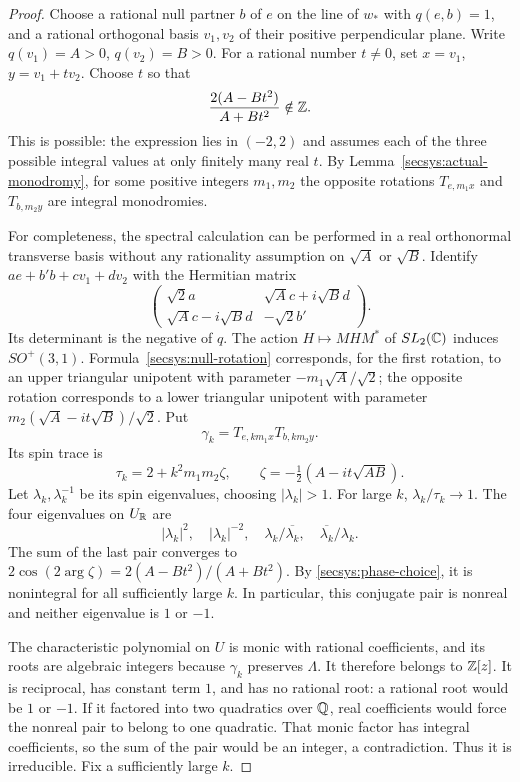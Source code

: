 \begin{proof}
Choose a rational null partner $b$ of $e$ on the line of $w_*$ with
$q(e,b)=1$, and a rational orthogonal basis $v_1,v_2$ of their positive
perpendicular plane.  Write $q(v_1)=A>0$, $q(v_2)=B>0$.
For a rational number $t\ne0$, set $x=v_1$, $y=v_1+t v_2$.
Choose $t$ so that
\begin{equation}\label{secsys:phase-choice}
                  \frac{2(A-Bt^2)}{A+Bt^2}\notin\mathbb Z.
\end{equation}
This is possible: the expression lies in $(-2,2)$ and assumes each
of the three possible integral values at only finitely many real $t$.
By Lemma~\ref{secsys:actual-monodromy}, for some positive integers
$m_1,m_2$ the opposite rotations $T_{e,m_1x}$ and $T_{b,m_2y}$ are
integral monodromies.

For completeness, the spectral calculation can be performed in a real
orthonormal transverse basis without any rationality assumption on
$\sqrt A$ or $\sqrt B$.  Identify
$a e+b' b+c v_1+d v_2$ with the Hermitian matrix
\[
 \begin{pmatrix}
 \sqrt2 a&\sqrt A c+i\sqrt B d\\
 \sqrt A c-i\sqrt B d&-\sqrt2 b'
 \end{pmatrix}.
\]
Its determinant is the negative of $q$.  The action
$H\mapsto MHM^*$ of $SL_2(\mathbb C)$ induces $SO^+(3,1)$.
Formula~\eqref{secsys:null-rotation} corresponds, for the first
rotation, to an upper triangular unipotent with parameter
$-m_1\sqrt A/\sqrt2$; the opposite rotation corresponds to a lower
triangular unipotent with parameter
$m_2(\sqrt A-i t\sqrt B)/\sqrt2$.
Put
\[
            \gamma_k=T_{e,km_1x}T_{b,km_2y}.
\]
Its spin trace is
\begin{equation}\label{secsys:spin-trace}
 \tau_k=2+k^2m_1m_2\zeta,
 \qquad \zeta=-\tfrac12(A-i t\sqrt{AB}).
\end{equation}
Let $\lambda_k,\lambda_k^{-1}$ be its spin eigenvalues, choosing
$|\lambda_k|>1$.  For large $k$,
$\lambda_k/\tau_k\to1$.  The four eigenvalues on $U_{\mathbb R}$ are
\[
 |\lambda_k|^2,\quad |\lambda_k|^{-2},\quad
 \lambda_k/\overline{\lambda_k},\quad
 \overline{\lambda_k}/\lambda_k.
\]
The sum of the last pair converges to
$2\cos(2\arg\zeta)=2(A-Bt^2)/(A+Bt^2)$.
By \eqref{secsys:phase-choice}, it is nonintegral for all sufficiently
large $k$.  In particular, this conjugate pair is nonreal and neither
eigenvalue is $1$ or $-1$.

The characteristic polynomial on $U$ is monic with rational
coefficients, and its roots are algebraic integers because
$\gamma_k$ preserves $\Lambda$.  It therefore belongs to $\mathbb Z[z]$.
It is reciprocal, has constant term $1$, and has no rational root:
a rational root would be $1$ or $-1$.  If it factored into two
quadratics over $\mathbb Q$, real coefficients would force the nonreal pair
to belong to one quadratic.  That monic factor has integral
coefficients, so the sum of the pair would be an integer, a
contradiction.  Thus it is irreducible.  Fix a sufficiently large $k$.


\end{proof}
